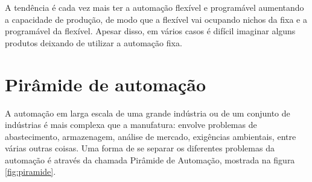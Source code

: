 A tendência é cada vez mais ter a automação flexível e programável aumentando a capacidade de produção, de modo que a flexível vai ocupando nichos da fixa e a programável da flexível. Apesar disso, em vários casos é difícil imaginar alguns produtos deixando de utilizar a automação fixa.

\section{Pirâmide de automação}

A automação em larga escala de uma grande indústria ou de um conjunto de indústrias é mais complexa que a manufatura: envolve problemas de abastecimento, armazenagem, análise de mercado, exigências ambientais, entre várias outras coisas. Uma forma de se separar os diferentes problemas da automação é através da chamada Pirâmide de Automação, mostrada na figura \ref{fig:piramide}.

